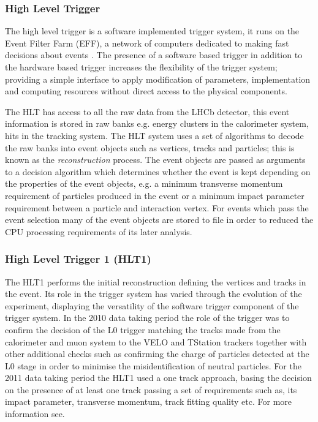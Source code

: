 \subsubsection*{High Level Trigger}
The high level trigger is a software implemented trigger system, it runs on the Event Filter Farm (EFF), a network of computers dedicated to making fast decisions about events \cite{1742-6596-396-1-012053}. The presence of a software based trigger in addition to the hardware based trigger increases the flexibility of the trigger system; providing a simple interface  to apply modification of parameters, implementation and computing resources without direct access to the physical components. 

The HLT has access to all the raw data from the LHCb detector, this event information is stored in raw banks e.g. energy clusters in the calorimeter system, hits in the tracking system. The HLT system uses a set of algorithms to decode the raw banks into event objects such as vertices, tracks and particles; this is known as the \emph{reconstruction} process. The event objects are passed as arguments to a decision algorithm which determines whether the event is kept depending on the properties of the event objects, e.g. a minimum transverse momentum requirement of particles produced in the event or a minimum impact parameter requirement between a particle and interaction vertex. For events which pass the event selection many of the event objects are stored to file in order to reduced the CPU processing requirements of its later analysis.

\subsubsection*{High Level Trigger 1 (HLT1)}
The HLT1 performs the initial reconstruction defining the vertices and tracks in the event. Its role in the trigger system has varied through the evolution of the experiment, displaying the versatility of the software trigger component of the trigger system. In the 2010 data taking period the role of the trigger was to confirm the decision of the L0 trigger matching the tracks made from the calorimeter and muon system to the VELO and TStation trackers together with other additional checks such as confirming the charge of particles detected at the L0 stage in order to minimise the misidentification of neutral particles. For the 2011 data taking period the HLT1 used a one track approach, basing the decision on the presence of at least one track passing a set of requirements such as, its impact parameter, transverse momentum, track fitting quality etc. For more information see. \cite{Antunes-Nobrega:630828} %

